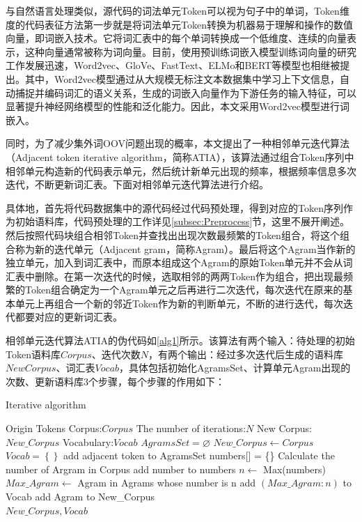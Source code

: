 与自然语言处理类似，源代码的词法单元Token可以视为句子中的单词，Token维度的代码表征方法第一步就是将词法单元Token转换为机器易于理解和操作的数值向量，即词嵌入技术。它将词汇表中的每个单词转换成一个低维度、连续的向量表示，这种向量通常被称为词向量。目前，使用预训练词嵌入模型训练词向量的研究工作发展迅速，Word2vec、GloVe、FastText、ELMo和BERT等模型也相继被提出。其中，Word2vec模型通过从大规模无标注文本数据集中学习上下文信息，自动捕捉并编码词汇的语义关系，生成的词嵌入向量作为下游任务的输入特征，可以显著提升神经网络模型的性能和泛化能力。因此，本文采用Word2vec模型进行词嵌入。

同时，为了减少集外词OOV问题出现的概率，本文提出了一种相邻单元迭代算法（Adjacent token iterative algorithm，简称ATIA），该算法通过组合Token序列中相邻单元构造新的代码表示单元，然后统计新单元出现的频率，根据频率信息多次迭代，不断更新词汇表。下面对相邻单元迭代算法进行介绍。

具体地，首先将代码数据集中的源代码经过代码预处理，得到对应的Token序列作为初始语料库，代码预处理的工作详见\ref{subsec:Preprocess}节，这里不展开阐述。然后按照代码块组合相邻Token并查找出出现次数最频繁的Token组合，将这个组合称为新的迭代单元（Adjacent gram，简称Agram）。最后将这个Agram当作新的独立单元，加入到词汇表中，而原本组成这个Agram的原始Token单元并不会从词汇表中删除。在第一次迭代的时候，选取相邻的两两Token作为组合，把出现最频繁的Token组合确定为一个Agram单元之后再进行二次迭代，每次迭代在原来的基本单元上再组合一个新的邻近Token作为新的判断单元，不断的进行迭代，每次迭代都要对应的更新词汇表。

相邻单元迭代算法ATIA的伪代码如\ref{alg1}所示。该算法有两个输入：待处理的初始Token语料库$Corpus$、迭代次数$N$，有两个输出：经过多次迭代后生成的语料库$NewCorpus$、词汇表$Vocab$，具体包括初始化AgramsSet、计算单元Agram出现的次数、更新语料库3个步骤，每个步骤的作用如下：

\begin{algorithm}[ht]  
	\renewcommand{\algorithmicrequire}{\textbf{Input:}}
	\renewcommand{\algorithmicensure}{\textbf{Output:}}
	\caption{Iterative algorithm}  
	\label{alg1}
	\begin{algorithmic}[1]
    \Require Origin Tokens Corpus:$Corpus$
    \Require The number of iterations:$N$
		\Ensure New Corpus: $New\_Corpus$
    \Ensure Vocabulary:$Vocab$
    \State $AgramsSet = \varnothing $ 
    \State $New\_Corpus \leftarrow Corpus $ 
    \State $Vocab = \left\{\right\} $  
          \State add adjacent token to AgramsSet
        \EndFor 
      \Else
        \State numbers[] = \{\} 
          \State Calculate the number of Argram in Corpus 
          \State add number to numbers  
        \EndFor 
        \State $n \leftarrow $ Max(numbers) 
        \State $Max\_Agram \leftarrow$ Agram in Agrams whose number is n
        \State add $\left(Max\_Agram:n\right)$ to Vocab 
        \State add Agram to New\_Corpus 
      \EndIf
    \EndFor \\
    \Return $New\_Corpus,Vocab$ 
	\end{algorithmic}
\end{algorithm}

